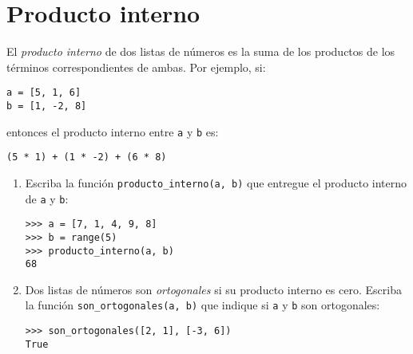 \section{Producto interno}

El \emph{producto interno} de dos listas de números es la suma de los
productos de los términos correspondientes de ambas.
Por ejemplo, si:
\begin{lstlisting}
a = [5, 1, 6]
b = [1, -2, 8]
\end{lstlisting}
entonces el producto interno entre \lstinline!a! y \lstinline!b! es:
\begin{lstlisting}
(5 * 1) + (1 * -2) + (6 * 8)
\end{lstlisting}

\begin{enumerate}

\item
  Escriba la función \lstinline!producto_interno(a, b)! que entregue el
  producto interno de \lstinline!a! y \lstinline!b!:

\begin{lstlisting}
>>> a = [7, 1, 4, 9, 8]
>>> b = range(5)
>>> producto_interno(a, b)
68
\end{lstlisting}

\item
  Dos listas de números son \emph{ortogonales} si su producto interno
  es cero. Escriba la función \lstinline!son_ortogonales(a, b)! que
  indique si \lstinline!a! y \lstinline!b! son ortogonales:
\begin{lstlisting}
>>> son_ortogonales([2, 1], [-3, 6])
True
\end{lstlisting}
\end{enumerate}
